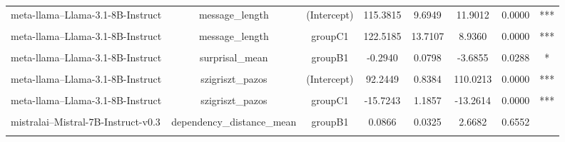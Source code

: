 \begin{table}[!h]
{\begin{tabular}{lccccccc}
\addlinespace
meta-llama--Llama-3.1-8B-Instruct & message_length & (Intercept) & 115.3815 & 9.6949 & 11.9012 & 0.0000 & ***\\
\cellcolor{gray!10}{meta-llama--Llama-3.1-8B-Instruct} & \cellcolor{gray!10}{message_length} & \cellcolor{gray!10}{groupB1} & \cellcolor{gray!10}{76.9000} & \cellcolor{gray!10}{13.7107} & \cellcolor{gray!10}{5.6088} & \cellcolor{gray!10}{0.0000} & \cellcolor{gray!10}{***}\\
meta-llama--Llama-3.1-8B-Instruct & message_length & groupC1 & 122.5185 & 13.7107 & 8.9360 & 0.0000 & ***\\
\cellcolor{gray!10}{meta-llama--Llama-3.1-8B-Instruct} & \cellcolor{gray!10}{surprisal_mean} & \cellcolor{gray!10}{(Intercept)} & \cellcolor{gray!10}{1.3636} & \cellcolor{gray!10}{0.0564} & \cellcolor{gray!10}{24.1764} & \cellcolor{gray!10}{0.0000} & \cellcolor{gray!10}{***}\\
meta-llama--Llama-3.1-8B-Instruct & surprisal_mean & groupB1 & -0.2940 & 0.0798 & -3.6855 & 0.0288 & *\\
\addlinespace
\cellcolor{gray!10}{meta-llama--Llama-3.1-8B-Instruct} & \cellcolor{gray!10}{surprisal_mean} & \cellcolor{gray!10}{groupC1} & \cellcolor{gray!10}{-0.5212} & \cellcolor{gray!10}{0.0798} & \cellcolor{gray!10}{-6.5340} & \cellcolor{gray!10}{0.0000} & \cellcolor{gray!10}{***}\\
meta-llama--Llama-3.1-8B-Instruct & szigriszt_pazos & (Intercept) & 92.2449 & 0.8384 & 110.0213 & 0.0000 & ***\\
\cellcolor{gray!10}{meta-llama--Llama-3.1-8B-Instruct} & \cellcolor{gray!10}{szigriszt_pazos} & \cellcolor{gray!10}{groupB1} & \cellcolor{gray!10}{-7.7317} & \cellcolor{gray!10}{1.1857} & \cellcolor{gray!10}{-6.5207} & \cellcolor{gray!10}{0.0000} & \cellcolor{gray!10}{***}\\
meta-llama--Llama-3.1-8B-Instruct & szigriszt_pazos & groupC1 & -15.7243 & 1.1857 & -13.2614 & 0.0000 & ***\\
\cellcolor{gray!10}{mistralai--Mistral-7B-Instruct-v0.3} & \cellcolor{gray!10}{dependency_distance_mean} & \cellcolor{gray!10}{(Intercept)} & \cellcolor{gray!10}{2.6218} & \cellcolor{gray!10}{0.0230} & \cellcolor{gray!10}{114.2368} & \cellcolor{gray!10}{0.0000} & \cellcolor{gray!10}{***}\\
\addlinespace
mistralai--Mistral-7B-Instruct-v0.3 & dependency_distance_mean & groupB1 & 0.0866 & 0.0325 & 2.6682 & 0.6552 & \\
\cellcolor{gray!10}{mistralai--Mistral-7B-Instruct-v0.3} & \cellcolor{gray!10}{dependency_distance_mean} & \cellcolor{gray!10}{groupC1} & \cellcolor{gray!10}{0.1845} & \cellcolor{gray!10}{0.0325} & \cellcolor{gray!10}{5.6831} & \cellcolor{gray!10}{0.0000} & \cellcolor{gray!10}{***}\\

\end{tabular}}
\end{table}
